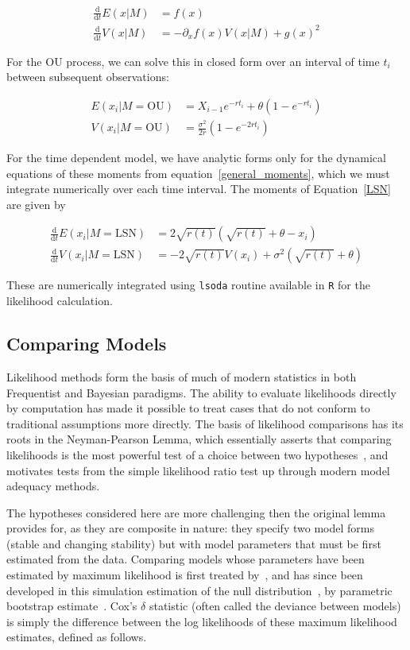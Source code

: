 \documentclass[authoryear,review,11pt]{elsarticle}
\newcommand{\ud}{\mathrm{d}}
\begin{document}
\begin{align}
 \frac{\ud }{\ud t} E(x| M)&=  f(x) \\
\frac{\ud}{\ud t} V(x| M) &=  -\partial_x f(x) V(x|M) + g(x)^2
  \label{general_moments}
\end{align}

For the OU process, we can solve this in closed form over an interval of time $t_i$ between subsequent observations:

\begin{align}
  E(x_i| M = \text{OU}) &= X_{i-1} e^{-r t_i} + \theta \left(1 - e^{-rt_i} \right) \\
V(x_i| M = \text{OU}) &= \frac{\sigma^2}{2 r} \left(1 - e^{-2 r t_i} \right)
\label{OUsoln}
\end{align}

For the time dependent model, we have analytic forms only for the dynamical equations of these moments from equation~\eqref{general_moments}, which we must integrate numerically over each time interval.
The moments of Equation~\eqref{LSN} are given by

\begin{align}
\frac{\ud }{\ud t} E(x_i| M = \text{LSN})&=  2\sqrt{r(t)}(\sqrt{r(t)}+\theta - x_i) \\
\frac{\ud}{\ud t} V(x_i| M = \text{LSN}) &=  -2 \sqrt{r(t)} V(x_i) + \sigma^2 ( \sqrt{r(t)}+\theta )
\label{LSNsoln}
\end{align}

These are numerically integrated using \texttt{lsoda} routine available in \texttt{R} for the likelihood calculation.

\subsection*{Comparing Models}
Likelihood methods form the basis of much of modern statistics
in both Frequentist and Bayesian paradigms.
The ability to evaluate likelihoods directly by computation has made it
possible to treat cases that do not conform to traditional assumptions more directly.
The basis of likelihood comparisons has its roots in the Neyman-Pearson Lemma,
which essentially asserts that comparing likelihoods is the most powerful test
of a choice between two hypotheses~\citep{Neyman1933}, and motivates
tests from the simple likelihood ratio test up through modern model adequacy methods.

The hypotheses considered here are more challenging then the original lemma provides for,
as they are composite in nature:
they specify two model forms (stable and changing stability)
but with model parameters that must be first estimated from the data.
Comparing models whose parameters have been estimated by maximum likelihood is first treated by~\citet{Cox1961, Cox1962},
and has since been developed in this simulation estimation of the null distribution~\citep{McLachlan1987}, by parametric bootstrap estimate~\citep{Efron1987}.
Cox's $\delta$ statistic (often called the deviance between models)
is simply the difference between the log likelihoods of these maximum likelihood estimates, defined as follows.
\end{document}
